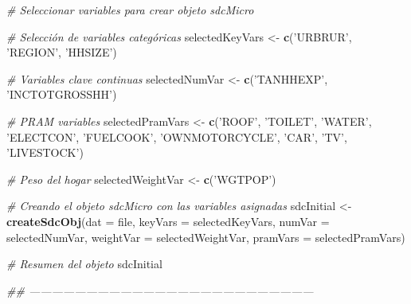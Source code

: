 \documentclass[]{book}
\newenvironment{Shaded}{\begin{snugshade}}{\end{snugshade}}
\newcommand{\CommentTok}[1]{\textcolor[rgb]{0.56,0.35,0.01}{\textit{#1}}}
\newcommand{\DataTypeTok}[1]{\textcolor[rgb]{0.13,0.29,0.53}{#1}}
\newcommand{\KeywordTok}[1]{\textcolor[rgb]{0.13,0.29,0.53}{\textbf{#1}}}
\newcommand{\NormalTok}[1]{#1}
\newcommand{\StringTok}[1]{\textcolor[rgb]{0.31,0.60,0.02}{#1}}
\theoremstyle{definition}
\theoremstyle{definition}
\theoremstyle{definition}
\theoremstyle{definition}
\theoremstyle{remark}
\begin{document}
\begin{Shaded}
\begin{Highlighting}[]
\CommentTok{# Seleccionar variables para crear objeto sdcMicro}

\CommentTok{# Selección de variables categóricas}
\NormalTok{selectedKeyVars <-}\StringTok{ }\KeywordTok{c}\NormalTok{(}\StringTok{'URBRUR'}\NormalTok{, }\StringTok{'REGION'}\NormalTok{, }\StringTok{'HHSIZE'}\NormalTok{)}

\CommentTok{# Variables clave continuas}
\NormalTok{selectedNumVar <-}\StringTok{ }\KeywordTok{c}\NormalTok{(}\StringTok{'TANHHEXP'}\NormalTok{, }\StringTok{'INCTOTGROSSHH'}\NormalTok{)}

\CommentTok{# PRAM variables}
\NormalTok{selectedPramVars <-}\StringTok{ }\KeywordTok{c}\NormalTok{(}\StringTok{'ROOF'}\NormalTok{, }\StringTok{'TOILET'}\NormalTok{, }\StringTok{'WATER'}\NormalTok{, }\StringTok{'ELECTCON'}\NormalTok{,}
                \StringTok{'FUELCOOK'}\NormalTok{, }\StringTok{'OWNMOTORCYCLE'}\NormalTok{, }\StringTok{'CAR'}\NormalTok{, }\StringTok{'TV'}\NormalTok{, }\StringTok{'LIVESTOCK'}\NormalTok{)}

\CommentTok{# Peso del hogar}
\NormalTok{selectedWeightVar <-}\StringTok{ }\KeywordTok{c}\NormalTok{(}\StringTok{'WGTPOP'}\NormalTok{)}


\CommentTok{# Creando el objeto sdcMicro con las variables asignadas}
\NormalTok{sdcInitial <-}\StringTok{ }\KeywordTok{createSdcObj}\NormalTok{(}\DataTypeTok{dat          =}\NormalTok{ file,}
                           \DataTypeTok{keyVars      =}\NormalTok{ selectedKeyVars,}
                           \DataTypeTok{numVar       =}\NormalTok{ selectedNumVar,}
                           \DataTypeTok{weightVar    =}\NormalTok{ selectedWeightVar,}
                           \DataTypeTok{pramVars     =}\NormalTok{ selectedPramVars)}

\CommentTok{# Resumen del objeto}
\NormalTok{sdcInitial}

\CommentTok{## ---------------------------------------------------------------------------}
\end{Highlighting}
\end{Shaded}
\end{document}

